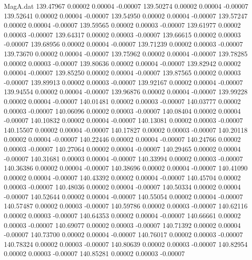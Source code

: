 \begin{filecontents}{MagA.dat}
 139.47967    0.00002    0.00004   -0.00007
 139.50274    0.00002    0.00004   -0.00007
 139.52641    0.00002    0.00004   -0.00007
 139.54950    0.00002    0.00004   -0.00007
 139.57247    0.00002    0.00004   -0.00007
 139.59565    0.00002    0.00003   -0.00007
 139.61977    0.00002    0.00003   -0.00007
 139.64317    0.00002    0.00003   -0.00007
 139.66615    0.00002    0.00003   -0.00007
 139.68956    0.00002    0.00004   -0.00007
 139.71239    0.00002    0.00003   -0.00007
 139.73670    0.00002    0.00004   -0.00007
 139.75962    0.00002    0.00004   -0.00007
 139.78285    0.00002    0.00003   -0.00007
 139.80636    0.00002    0.00004   -0.00007
 139.82942    0.00002    0.00004   -0.00007
 139.85250    0.00002    0.00004   -0.00007
 139.87565    0.00002    0.00003   -0.00007
 139.89913    0.00002    0.00003   -0.00007
 139.92167    0.00002    0.00004   -0.00007
 139.94554    0.00002    0.00004   -0.00007
 139.96876    0.00002    0.00004   -0.00007
 139.99228    0.00002    0.00004   -0.00007
 140.01481    0.00002    0.00003   -0.00007
 140.03777    0.00002    0.00003   -0.00007
 140.06096    0.00002    0.00003   -0.00007
 140.08404    0.00002    0.00004   -0.00007
 140.10832    0.00002    0.00004   -0.00007
 140.13081    0.00002    0.00003   -0.00007
 140.15507    0.00002    0.00004   -0.00007
 140.17827    0.00002    0.00003   -0.00007
 140.20118    0.00002    0.00004   -0.00007
 140.22446    0.00002    0.00004   -0.00007
 140.24766    0.00002    0.00003   -0.00007
 140.27064    0.00002    0.00004   -0.00007
 140.29465    0.00002    0.00004   -0.00007
 140.31681    0.00003    0.00004   -0.00007
 140.33994    0.00002    0.00003   -0.00007
 140.36386    0.00002    0.00004   -0.00007
 140.38696    0.00002    0.00004   -0.00007
 140.41090    0.00002    0.00004   -0.00007
 140.43392    0.00002    0.00004   -0.00007
 140.45704    0.00002    0.00003   -0.00007
 140.48036    0.00002    0.00004   -0.00007
 140.50334    0.00002    0.00004   -0.00007
 140.52644    0.00002    0.00004   -0.00007
 140.55054    0.00002    0.00004   -0.00007
 140.57487    0.00002    0.00003   -0.00007
 140.59786    0.00002    0.00003   -0.00007
 140.62116    0.00002    0.00003   -0.00007
 140.64353    0.00002    0.00004   -0.00007
 140.66661    0.00002    0.00003   -0.00007
 140.69077    0.00002    0.00003   -0.00007
 140.71392    0.00002    0.00004   -0.00007
 140.73700    0.00002    0.00004   -0.00007
 140.76017    0.00002    0.00003   -0.00007
 140.78324    0.00002    0.00003   -0.00007
 140.80639    0.00002    0.00003   -0.00007
 140.82954    0.00002    0.00003   -0.00007
 140.85281    0.00002    0.00003   -0.00007

\end{filecontents}
